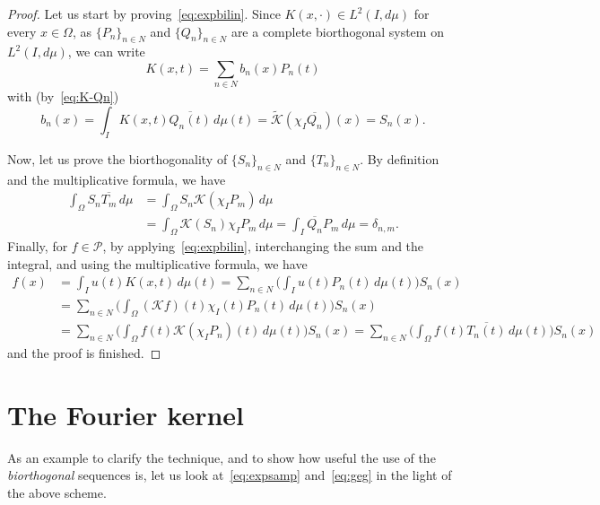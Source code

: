 \documentclass[11pt,a4paper]{amsart}
\theoremstyle{plain}
\theoremstyle{definition}
\newcommand{\calK}{\mathcal{K}}
\newcommand{\calP}{\mathcal{P}}
\begin{document}
\begin{proof}
Let us start by proving~\eqref{eq:expbilin}. Since $K(x,\cdot) \in
L^2(I,d\mu)$ for every $x \in \Omega$, as $\{P_n\}_{n \in N}$ and
$\{Q_n\}_{n \in N}$ are a complete biorthogonal system on
$L^2(I,d\mu)$, we can write
\begin{equation*}
  K(x,t) = \sum_{n \in N} b_n(x) P_n(t)
\end{equation*}
with (by~\eqref{eq:K-Qn})
\begin{equation*}
  b_n(x) = \int_{I} K(x,t) \overline{Q_n(t)}\,d\mu(t)
  = \widetilde{\calK}(\chi_I \overline{Q_n})(x)
  = S_n(x).
\end{equation*}

Now, let us prove the biorthogonality of $\{S_n\}_{n\in N}$ and $\{T_n\}_{n\in N}$.
By definition and the multiplicative formula, we have
\begin{align*}
  \int_{\Omega} S_n \overline{T_m}\,d\mu
  &= \int_{\Omega} S_n \calK(\chi_I P_m)\,d\mu \\
  &= \int_{\Omega} \calK(S_n) \chi_I P_m \,d\mu
  = \int_{I} \overline{Q_n} P_m \,d\mu = \delta_{n,m}.
\end{align*}
Finally, for $f \in \calP$, by applying~\eqref{eq:expbilin},
interchanging the sum and the integral, and using the multiplicative
formula, we have
\begin{align*}
  f(x) &= \int_I u(t) K(x,t)\,d\mu(t)
  = \sum_{n \in N} \Big( \int_I u(t) P_n(t)\,d\mu(t) \Big) S_n(x) \\
  &= \sum_{n \in N} \Big( \int_{\Omega} (\calK f)(t) \chi_I(t) P_n(t)\,d\mu(t) \Big) S_n(x) \\
  &= \sum_{n \in N} \Big( \int_{\Omega} f(t) \calK(\chi_I P_n)(t)\,d\mu(t) \Big) S_n(x)
  = \sum_{n \in N} \Big( \int_{\Omega} f(t) \overline{T_n(t)}\,d\mu(t) \Big) S_n(x)
\end{align*}
and the proof is finished.
\end{proof}


\section{The Fourier kernel}

As an example to clarify the technique, and to show how useful the use 
of the \textit{biorthogonal} sequences is, let us look at~\eqref{eq:expsamp}
and~\eqref{eq:geg} in the light of the above scheme.

\end{document}
